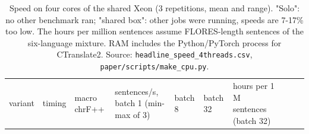 \begin{table}[t]
\centering
\scriptsize
\setlength{\tabcolsep}{3pt}
\caption{Speed on four cores of the shared Xeon (3 repetitions, mean and range). "Solo": no other benchmark ran; "shared box": other jobs were running, speeds are 7-17\% too low. The hours per million sentences assume FLORES-length sentences of the six-language mixture. RAM includes the Python/PyTorch process for CTranslate2. Source: \texttt{headline\_speed\_4threads.csv}, \texttt{paper/scripts/make\_cpu.py}.}
\label{tab:t_cpu_speed}
{\def\LTcaptype{none} %
\begin{tabular}{@{}
  >{\raggedright\arraybackslash}p{}
  >{\raggedright\arraybackslash}p{}
  >{\raggedleft\arraybackslash}p{}
  >{\raggedleft\arraybackslash}p{}
  >{\raggedleft\arraybackslash}p{}
  >{\raggedleft\arraybackslash}p{}
  >{\raggedleft\arraybackslash}p{}
  >{\raggedleft\arraybackslash}p{}
  >{\raggedleft\arraybackslash}p{}
  >{\raggedleft\arraybackslash}p{}@{}}
\toprule
\begin{minipage}[b]{\linewidth}\raggedright
variant
\end{minipage} & \begin{minipage}[b]{\linewidth}\raggedright
timing
\end{minipage} & \begin{minipage}[b]{\linewidth}\raggedleft
macro chrF++
\end{minipage} & \begin{minipage}[b]{\linewidth}\raggedleft
sentences/s, batch 1 (min-max of 3)
\end{minipage} & \begin{minipage}[b]{\linewidth}\raggedleft
batch 8
\end{minipage} & \begin{minipage}[b]{\linewidth}\raggedleft
batch 32
\end{minipage} & \begin{minipage}[b]{\linewidth}\raggedleft
hours per 1 M sentences (batch 32)
\end{minipage} & \begin{minipage}[b]{\linewidth}\raggedleft

\end{minipage}
\end{tabular}}
\end{table}

